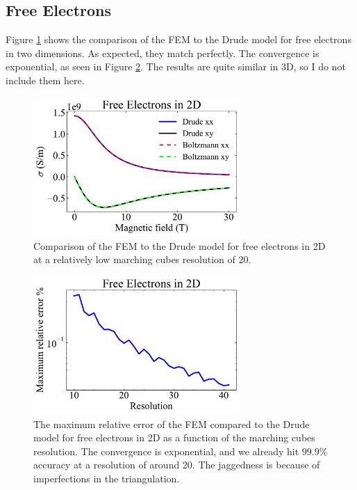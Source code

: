 \documentclass[12pt]{article}
\begin{document}
\subsection{Free Electrons}
Figure \ref{fig:free_electrons} shows the comparison of the FEM to the Drude model for free
electrons in two dimensions. As expected, they match perfectly. The convergence is exponential,
as seen in Figure \ref{fig:free_electrons_error}. The results are quite similar in 3D,
so I do not include them here.
\begin{figure}%
    \centering
    \includegraphics[width=0.7\textwidth]{figures/boltzmann_vs_drude_2d}
    \caption{Comparison of the FEM to the Drude model for free electrons in 2D at a relatively
        low marching cubes resolution of 20.}
    \label{fig:free_electrons}
\end{figure}
\begin{figure}%
    \centering
    \includegraphics[width=0.7\textwidth]{figures/boltzmann_vs_drude_2d_error}
    \caption{The maximum relative error of the FEM compared to the Drude model for free
        electrons in 2D as a function of the marching cubes resolution. The convergence
        is exponential, and we already hit $99.9\%$ accuracy at a resolution of around 20.
        The jaggedness is because of imperfections in the triangulation.}
    \label{fig:free_electrons_error}
\end{figure}
\end{document}
